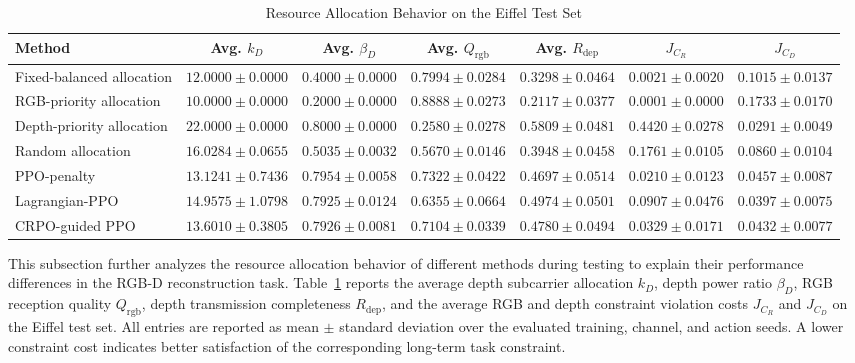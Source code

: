 \documentclass[journal]{IEEEtran}
\begin{document}
\begin{table}[t]
\centering
\caption{Resource Allocation Behavior on the Eiffel Test Set}
\label{tab:eiffel_resource_allocation_behavior}
\setlength{\tabcolsep}{6pt}
\renewcommand{\arraystretch}{1.05}
\begin{tabular}{l c c c c c c}
\hline
Method 
& Avg. $k_D$ 
& Avg. \(\beta_D\)
& Avg. $Q_{\mathrm{rgb}}$
& Avg. $R_{\mathrm{dep}}$
& $J_{C_R}$
& $J_{C_D}$ \\
\hline
Fixed-balanced allocation & $12.0000\pm0.0000$ & $0.4000\pm0.0000$ & $0.7994\pm0.0284$ & $0.3298\pm0.0464$ & $0.0021\pm0.0020$ & $0.1015\pm0.0137$ \\
RGB-priority allocation & $10.0000\pm0.0000$ & $0.2000\pm0.0000$ & $0.8888\pm0.0273$ & $0.2117\pm0.0377$ & $0.0001\pm0.0000$ & $0.1733\pm0.0170$ \\
Depth-priority allocation & $22.0000\pm0.0000$ & $0.8000\pm0.0000$ & $0.2580\pm0.0278$ & $0.5809\pm0.0481$ & $0.4420\pm0.0278$ & $0.0291\pm0.0049$ \\
Random allocation & $16.0284\pm0.0655$ & $0.5035\pm0.0032$ & $0.5670\pm0.0146$ & $0.3948\pm0.0458$ & $0.1761\pm0.0105$ & $0.0860\pm0.0104$ \\
PPO-penalty & $13.1241\pm0.7436$ & $0.7954\pm0.0058$ & $0.7322\pm0.0422$ & $0.4697\pm0.0514$ & $0.0210\pm0.0123$ & $0.0457\pm0.0087$ \\
Lagrangian-PPO & $14.9575\pm1.0798$ & $0.7925\pm0.0124$ & $0.6355\pm0.0664$ & $0.4974\pm0.0501$ & $0.0907\pm0.0476$ & $0.0397\pm0.0075$ \\
CRPO-guided PPO & $13.6010\pm0.3805$ & $0.7926\pm0.0081$ & $0.7104\pm0.0339$ & $0.4780\pm0.0494$ & $0.0329\pm0.0171$ & $0.0432\pm0.0077$ \\
\hline
\end{tabular}
\end{table}

This subsection further analyzes the resource allocation behavior of different methods during testing to explain their performance differences in the RGB-D reconstruction task. Table~\ref{tab:eiffel_resource_allocation_behavior} reports the average depth subcarrier allocation $k_D$, depth power ratio $\beta_D$, RGB reception quality $Q_{\mathrm{rgb}}$, depth transmission completeness $R_{\mathrm{dep}}$, and the average RGB and depth constraint violation costs $J_{C_R}$ and $J_{C_D}$ on the Eiffel test set. All entries are reported as mean $\pm$ standard deviation over the evaluated training, channel, and action seeds. A lower constraint cost indicates better satisfaction of the corresponding long-term task constraint.
\end{document}

